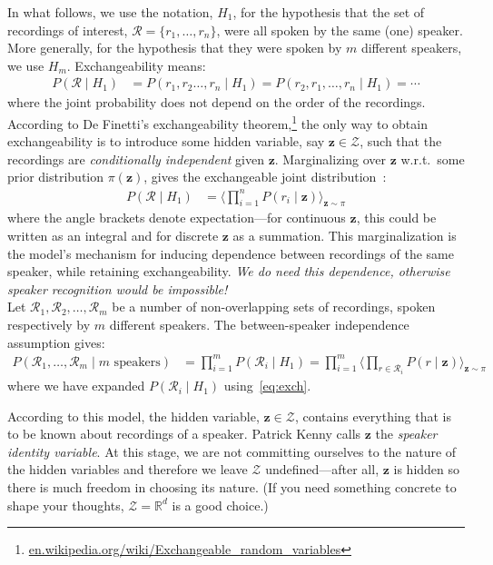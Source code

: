 \documentclass[a4paper,oneside,12pt,english]{report}
\def\zvec{\mathbf{z}}
\def\expv#1#2{\bigl\langle#1\bigr\rangle_{#2}}
\def\R{\mathbb{R}}
\def\Zset{\mathcal{Z}}
\def\Rset{\mathcal{R}}
\def\Zset{\mathcal{Z}}
\begin{document}
\noindent In what follows, we use the notation, $H_1$, for the hypothesis that the set of recordings of interest, $\Rset=\{r_1,\ldots,r_n\}$, were all spoken by the same (one) speaker. More generally, for the hypothesis that they were spoken by $m$ different speakers, we use $H_m$. Exchangeability means:
\begin{align*}
P(\Rset\mid H_1) &= P(r_1,r_2\ldots,r_n\mid H_1) = P(r_2,r_1,\ldots,r_n\mid H_1) = \cdots
\end{align*}
where the joint probability does not depend on the order of the recordings. According to De Finetti's exchangeability theorem,\footnote{\url{en.wikipedia.org/wiki/Exchangeable_random_variables}} the only way to obtain exchangeability is to introduce some hidden variable, say $\zvec\in\Zset$, such that the recordings are \emph{conditionally independent} given $\zvec$. Marginalizing over $\zvec$ w.r.t.\ some prior distribution $\pi(\zvec)$, gives the exchangeable joint distribution~\cite{Chow}:  
\begin{align}
\label{eq:exch}
P(\Rset\mid H_1) &= \expv{\prod_{i=1}^n P(r_i\mid \zvec)}{\zvec\sim\pi}
\end{align}
where the angle brackets denote expectation---for continuous $\zvec$, this could be written as an integral and for discrete $\zvec$ as a summation. This marginalization is the model's mechanism for inducing dependence between recordings of the same speaker, while retaining exchangeability. \emph{We do need this dependence, otherwise speaker recognition would be impossible!}\\

\noindent Let $\Rset_1,\Rset_2,\ldots,\Rset_m$ be a number of non-overlapping sets of recordings, spoken respectively by $m$ different speakers. The between-speaker independence assumption gives:
\begin{align}
\label{eq:iid}
P(\Rset_1,\ldots,\Rset_m\mid\text{$m$ speakers}) &= \prod_{i=1}^m P(\Rset_i\mid H_1) = \prod_{i=1}^m \expv{\prod_{r\in\Rset_i} P(r\mid\zvec)}{\zvec\sim\pi}   
\end{align}
where we have expanded $P(\Rset_i\mid H_1)$ using~\eqref{eq:exch}.

According to this model, the hidden variable, $\zvec\in\Zset$, contains everything that is to be known about recordings of a speaker. Patrick Kenny calls $\zvec$ the \emph{speaker identity variable}. At this stage, we are not committing ourselves to the nature of the hidden variables and therefore we leave $\Zset$ undefined---after all, $\zvec$ is hidden so there is much freedom in choosing its nature. (If you need something concrete to shape your thoughts, $\Zset=\R^d$ is a good choice.) 
\end{document}
